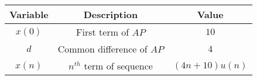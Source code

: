 \begin{tabular}{|c|c|c|} 
    \hline
\textbf{Variable}& \textbf{Description}& \textbf{Value}\\\hline
       $x(0)$& First term of $AP$ & $10$ \\ \hline
       $d$ & Common difference of $AP$ & $4$ \\ \hline
        $x(n)$& $n^{th}$ term of sequence& $(4n+10)u(n)$\\ \hline 
        
  \end{tabular}